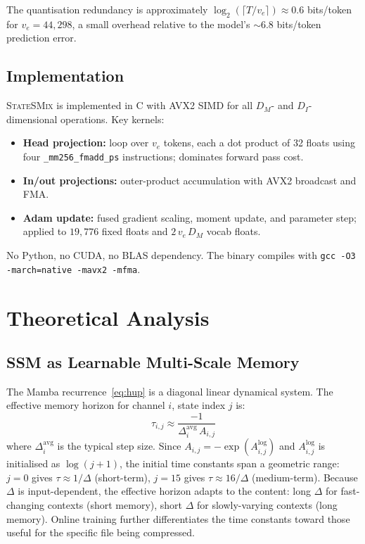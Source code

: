 \documentclass[10pt,twocolumn]{article}
\newcommand{\ssmcomp}{\textsc{StateSMix}}
\begin{document}
The quantisation redundancy is approximately
$\log_2(\lceil T/v_e\rceil)\approx 0.6$ bits/token for
$v_e=44{,}298$, a small overhead relative to the model's ${\sim}6.8$
bits/token prediction error.

\subsection{Implementation}
\label{sec:impl}

\ssmcomp{} is implemented in C with AVX2 SIMD for all
$D_M$- and $D_I$-dimensional operations.  Key kernels:
\begin{itemize}
  \item \textbf{Head projection:} loop over $v_e$ tokens, each
    a dot product of 32 floats using four \texttt{\_mm256\_fmadd\_ps}
    instructions; dominates forward pass cost.
  \item \textbf{In/out projections:} outer-product accumulation
    with AVX2 broadcast and FMA.
  \item \textbf{Adam update:} fused gradient scaling, moment
    update, and parameter step; applied to $19{,}776$ fixed floats
    and $2\,v_e\,D_M$ vocab floats.
\end{itemize}
No Python, no CUDA, no BLAS dependency.  The binary compiles with
\texttt{gcc -O3 -march=native -mavx2 -mfma}.

\section{Theoretical Analysis}
\label{sec:theory}

\subsection{SSM as Learnable Multi-Scale Memory}

The Mamba recurrence~\eqref{eq:hup} is a diagonal linear dynamical
system.  The effective memory horizon for channel $i$, state index $j$
is:
\begin{equation}
  \tau_{i,j} \approx \frac{-1}{\Delta_i^\text{avg}\,A_{i,j}}
\end{equation}
where $\Delta_i^\text{avg}$ is the typical step size.
Since $A_{i,j}=-\exp(A^\text{log}_{i,j})$ and
$A^\text{log}_{i,j}$ is initialised as $\log(j+1)$, the initial
time constants span a geometric range:
$j=0$ gives $\tau\approx 1/\Delta$ (short-term), $j=15$ gives
$\tau\approx 16/\Delta$ (medium-term).
Because $\Delta$ is input-dependent, the effective horizon adapts
to the content: long $\Delta$ for fast-changing contexts (short
memory), short $\Delta$ for slowly-varying contexts (long memory).
Online training further differentiates the time constants toward
those useful for the specific file being compressed.
\end{document}
